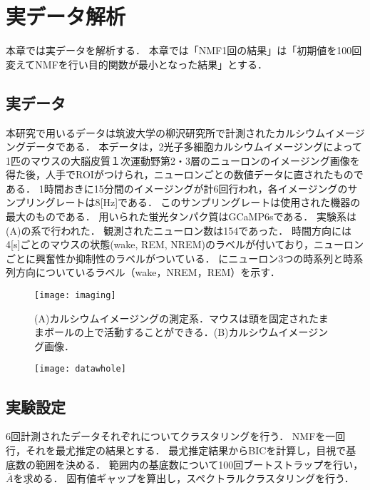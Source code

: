 \chapter{実データ解析}
本章では実データを解析する．
本章では「NMF1回の結果」は「初期値を100回変えてNMFを行い目的関数が最小となった結果」とする．

\section{実データ}
本研究で用いるデータは筑波大学の柳沢研究所で計測されたカルシウムイメージングデータである．
本データは，2光子多細胞カルシウムイメージングによって1匹のマウスの大脳皮質１次運動野第2・3層のニューロンのイメージング画像を得た後，人手でROIがつけられ，ニューロンごとの数値データに直されたものである．
1時間おきに15分間のイメージングが計6回行われ，各イメージングのサンプリングレートは8[Hz]である．
このサンプリングレートは使用された機器の最大のものである．
用いられた蛍光タンパク質はGCaMP6sである．
実験系は(A)の系で行われた\cite{Kanda2016}．
観測されたニューロン数は154であった．
時間方向には4[s]ごとのマウスの状態(wake, REM, NREM)のラベルが付いており，ニューロンごとに興奮性か抑制性のラベルがついている．
にニューロン3つの時系列と時系列方向についているラベル（wake，NREM，REM）を示す．

\begin{figure}[htbp]
    \begin{center}
				\texttt{[image: imaging]}
				\caption{(A)カルシウムイメージングの測定系．マウスは頭を固定されたままボールの上で活動することができる．(B)カルシウムイメージング画像．}
        \label{fig:imaging}
    \end{center}
\end{figure}

\begin{figure}[htbp]
	\begin{center}
		\texttt{[image: datawhole]}
	\end{center}
	\label{fig:wholedata}
\end{figure}

\section{実験設定}
6回計測されたデータそれぞれについてクラスタリングを行う．
NMFを一回行，それを最尤推定の結果とする．
最尤推定結果からBICを計算し，目視で基底数の範囲を決める．
範囲内の基底数について100回ブートストラップを行い，$\bar{A}$を求める．
固有値ギャップを算出し，スペクトラルクラスタリングを行う．

